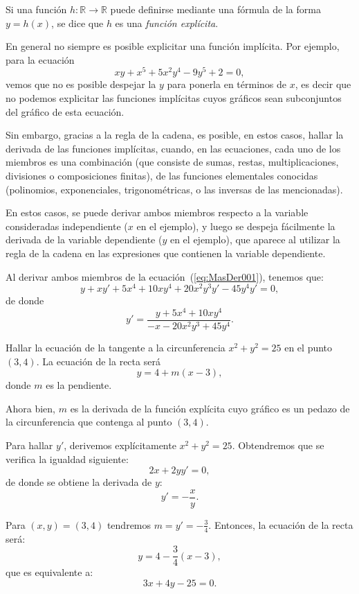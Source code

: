 Si una función $h\colon\mathbb{R}  \rightarrow \mathbb{R}$ puede definirse mediante una fórmula de
la forma $y=h(x)$, se dice que $h$ es una \emph{función explícita}.

En general no siempre es posible explicitar una función implícita. Por ejemplo, para la ecuación
\begin{equation}
\label{eq:MasDer001}
	xy+x^{5}+5x^{2}y^{4}-9y^{5}+2=0,
\end{equation}
vemos que no es posible despejar la $y$ para ponerla en términos de $x$, es decir que no podemos
explicitar las funciones implícitas cuyos gráficos sean subconjuntos del gráfico de esta ecuación.

Sin embargo, gracias a la regla de la cadena, es posible, en estos casos, hallar la derivada de las
funciones implícitas, cuando, en las ecuaciones, cada uno de los miembros es una combinación (que
consiste de sumas, restas, multiplicaciones, divisiones o composiciones finitas), de las funciones
elementales conocidas (polinomios, exponenciales, trigonométricas, o las inversas de las
mencionadas).

En estos casos, se puede derivar ambos miembros respecto a la variable consideradas independiente
($x$ en el ejemplo), y luego se despeja fácilmente la derivada de la variable dependiente ($y$ en
el ejemplo), que aparece al utilizar la regla de la cadena en las expresiones que contienen la
variable dependiente.

Al derivar ambos miembros de la ecuación~(\ref{eq:MasDer001}), tenemos que:
\begin{equation*}
	 y+xy'+5x^{4}+10xy^{4}+20x^{2}y^{3}y'-45y^{4}y'=0,
\end{equation*}
de donde
\begin{equation*}
	 y'=\frac{y+5x^{4}+10xy^{4}}{-x-20x^{2}y^{3}+45y^{4}}.
\end{equation*}

\begin{exemplo}[Solución]{%
Hallar la ecuación de la tangente a la circunferencia $x^{2}+y^{2}=25$ en el punto
$(3,4)$.
}%
La ecuación de la recta será
\begin{equation*}
	y=4+m(x-3),
\end{equation*}
donde $m$ es la pendiente.

Ahora bien, $m$ es la derivada de la función explícita cuyo gráfico es un pedazo de la
circunferencia que contenga al punto $(3,4)$.

Para hallar $y'$, derivemos explícitamente $x^{2}+y^{2}=25$. Obtendremos que se verifica la
igualdad siguiente:
\[
2x+2yy'=0,
\]
de donde se obtiene la derivada de $y$:
\begin{equation*}
	y'=-\frac{x}{y}.
\end{equation*}

Para $(x,y)=(3,4)$ tendremos $m=y'=-\frac{3}{4}$. Entonces, la ecuación de la recta será:
\[
y=4-\frac{3}{4}(x-3),
\]
que es equivalente a:
\begin{equation*}
	3x+4y-25=0.
\end{equation*}
\end{exemplo}

